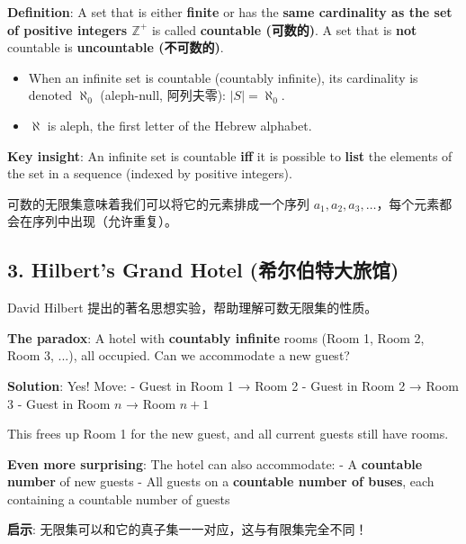 \documentclass[10pt,a4paper,openany]{ctexbook}
\theoremstyle{definition}
\theoremstyle{remark}
\renewenvironment{quote}
  {\list{}{\leftmargin=1em\rightmargin=0pt\topsep=0.5pt\partopsep=0pt}\item[]}
  {\endlist}
\begin{document}
\textbf{Definition}: A set that is either \textbf{finite} or has the \textbf{same cardinality as the set of positive integers $\mathbb{Z}^+$} is called \textbf{countable (可数的)}. A set that is \textbf{not} countable is \textbf{uncountable (不可数的)}.
\begin{itemize}
\item When an infinite set is countable (countably infinite), its cardinality is denoted $\aleph_0$ (aleph-null, 阿列夫零): $|S| = \aleph_0$.
\item $\aleph$ is aleph, the first letter of the Hebrew alphabet.

\end{itemize}

\textbf{Key insight}: An infinite set is countable \textbf{iff} it is possible to \textbf{list} the elements of the set in a sequence (indexed by positive integers).
\begin{quote}
可数的无限集意味着我们可以将它的元素排成一个序列 $a_1, a_2, a_3, \dots$，每个元素都会在序列中出现（允许重复）。

\end{quote}
\vspace{-2pt}

\subsection{3. Hilbert's Grand Hotel (希尔伯特大旅馆)}

\begin{quote}
David Hilbert 提出的著名思想实验，帮助理解可数无限集的性质。

\textbf{The paradox}: A hotel with \textbf{countably infinite} rooms (Room 1, Room 2, Room 3, ...), all occupied. Can we accommodate a new guest?

\textbf{Solution}: Yes! Move:
- Guest in Room 1 → Room 2
- Guest in Room 2 → Room 3
- Guest in Room $n$ → Room $n+1$

This frees up Room 1 for the new guest, and all current guests still have rooms.

\textbf{Even more surprising}: The hotel can also accommodate:
- A \textbf{countable number} of new guests
- All guests on a \textbf{countable number of buses}, each containing a countable number of guests

\textbf{启示}: 无限集可以和它的真子集一一对应，这与有限集完全不同！

\end{quote}
\vspace{-2pt}
\end{document}
